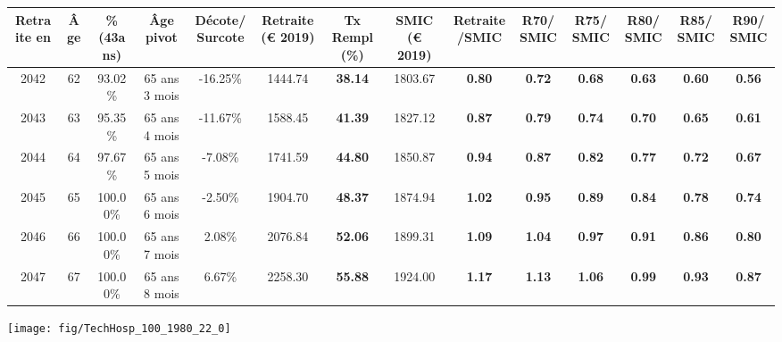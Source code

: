 \begin{adjustbox}{max width=\textwidth} 
\begin{tabular}[htb]{|c|c||c|c|c||c|c||c|c||c|c|c|c|c|} 
\hline 
 Retraite en &  Âge &  \%(43ans) &  Âge pivot &  Décote/Surcote &  Retraite (\euro{} 2019) &  Tx Rempl(\%) &  SMIC (\euro{} 2019) &  Retraite/SMIC &  R70/SMIC &  R75/SMIC &  R80/SMIC &  R85/SMIC &  R90/SMIC \\ 
\hline \hline 
 2042 &  62 &  93.02\% &  65 ans 3 mois &  -16.25\% &  1444.74 &  {\bf 38.14} &  1803.67 &  {\bf {\color{red} 0.80}} &  {\bf {\color{red} 0.72}} &  {\bf {\color{red} 0.68}} &  {\bf {\color{red} 0.63}} &  {\bf {\color{red} 0.60}} &  {\bf {\color{red} 0.56}} \\ 
\hline 
 2043 &  63 &  95.35\% &  65 ans 4 mois &  -11.67\% &  1588.45 &  {\bf 41.39} &  1827.12 &  {\bf {\color{red} 0.87}} &  {\bf {\color{red} 0.79}} &  {\bf {\color{red} 0.74}} &  {\bf {\color{red} 0.70}} &  {\bf {\color{red} 0.65}} &  {\bf {\color{red} 0.61}} \\ 
\hline 
 2044 &  64 &  97.67\% &  65 ans 5 mois &  -7.08\% &  1741.59 &  {\bf 44.80} &  1850.87 &  {\bf {\color{red} 0.94}} &  {\bf {\color{red} 0.87}} &  {\bf {\color{red} 0.82}} &  {\bf {\color{red} 0.77}} &  {\bf {\color{red} 0.72}} &  {\bf {\color{red} 0.67}} \\ 
\hline 
 2045 &  65 &  100.00\% &  65 ans 6 mois &  -2.50\% &  1904.70 &  {\bf 48.37} &  1874.94 &  {\bf 1.02} &  {\bf {\color{red} 0.95}} &  {\bf {\color{red} 0.89}} &  {\bf {\color{red} 0.84}} &  {\bf {\color{red} 0.78}} &  {\bf {\color{red} 0.74}} \\ 
\hline 
 2046 &  66 &  100.00\% &  65 ans 7 mois &  2.08\% &  2076.84 &  {\bf 52.06} &  1899.31 &  {\bf 1.09} &  {\bf 1.04} &  {\bf {\color{red} 0.97}} &  {\bf {\color{red} 0.91}} &  {\bf {\color{red} 0.86}} &  {\bf {\color{red} 0.80}} \\ 
\hline 
 2047 &  67 &  100.00\% &  65 ans 8 mois &  6.67\% &  2258.30 &  {\bf 55.88} &  1924.00 &  {\bf 1.17} &  {\bf 1.13} &  {\bf 1.06} &  {\bf {\color{red} 0.99}} &  {\bf {\color{red} 0.93}} &  {\bf {\color{red} 0.87}} \\ 
\hline 
\hline 
\end{tabular} 
\end{adjustbox} 
 
 \vspace{0.1cm} 

 {\hspace{-2.2cm}\texttt{[image: fig/TechHosp\_100\_1980\_22\_0]}} 

